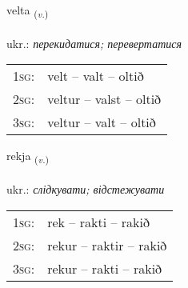 \documentclass[frontgrid, backgrid]{flacards}\usepackage[]{graphicx}\usepackage[]{xcolor}
\begin{document}
\renewcommand{\flhead}{\vskip5pt \fboxsep=0pt {\small\bfseries\footnotesize Sagnorð | дієслово}}
\renewcommand{\fcfoot}{\vskip5pt \fboxsep=0pt \hspace{2pt}{\small\bfseries\footnotesize 1K}}

\renewcommand{\blhead}{\vskip5pt {\small\bfseries\footnotesize Sagnorð | дієслово }}
\renewcommand{\bcfoot}{\vskip5pt \hspace{2pt}{\small\bfseries\footnotesize 1K}}


{velta \small{\textsubscript{(\textit{v.})}} \\[1ex] %
\textphonetic{[vɛl̥ta]} \\
ukr.: \emph{перекидатися; перевертатися} \\  [2ex]
\renewcommand*{\arraystretch}{0.8}
\begin{tabular}{p{1cm}l}
\textsc{1sg}: & velt -- valt -- oltið \\ 
\textsc{2sg}: & veltur -- valst -- oltið \\ 
\textsc{3sg}: & veltur -- valt -- oltið \\ 
\end{tabular}
}

\renewcommand{\flhead}{\vskip5pt \fboxsep=0pt {\small\bfseries\footnotesize Sagnorð | дієслово}}
\renewcommand{\fcfoot}{\vskip5pt \fboxsep=0pt \hspace{2pt}{\small\bfseries\footnotesize 1K}}

\renewcommand{\blhead}{\vskip5pt {\small\bfseries\footnotesize Sagnorð | дієслово }}
\renewcommand{\bcfoot}{\vskip5pt \hspace{2pt}{\small\bfseries\footnotesize 1K}}


{rekja \small{\textsubscript{(\textit{v.})}} \\[1ex] %
\textphonetic{[rɛːca]} \\
ukr.: \emph{слідкувати; відстежувати} \\  [2ex]
\renewcommand*{\arraystretch}{0.8}
\begin{tabular}{p{1cm}l}
\textsc{1sg}: & rek -- rakti -- rakið \\ 
\textsc{2sg}: & rekur -- raktir -- rakið \\ 
\textsc{3sg}: & rekur -- rakti -- rakið \\ 
\end{tabular}
}
\end{document}
